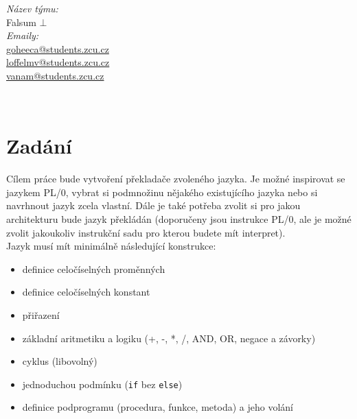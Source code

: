 \documentclass[12pt,a4paper]{article}
\begin{document}
\begin{titlepage}
\begin{minipage}{0.4\textwidth}
\begin{flushright}
\emph{Název týmu:} \\
Falsum $\bot$\\[0.2cm] %

\emph{Emaily:} \\
\href{mailto:goheeca@students.zcu.cz}{goheeca@students.zcu.cz}\\
\href{mailto:loffelmv@students.zcu.cz}{loffelmv@students.zcu.cz}\\
\href{mailto:vanam@students.zcu.cz}{vanam@students.zcu.cz}\\[0.2cm] %


\end{flushright}
\end{minipage}\\

\end{titlepage}


\thispagestyle{empty}

\tableofcontents


\newpage


\setcounter{page}{3}


\section{Zadání}

Cílem práce bude vytvoření překladače zvoleného jazyka. Je možné inspirovat se jazykem PL/0, vybrat si podmnožinu nějakého existujícího jazyka nebo si navrhnout jazyk zcela vlastní. Dále je také potřeba zvolit si pro jakou architekturu bude jazyk překládán (doporučeny jsou instrukce PL/0, ale je možné zvolit jakoukoliv instrukční sadu pro kterou budete mít interpret).\\

\noindent
Jazyk musí mít minimálně následující konstrukce:

\begin{itemize}
	\item definice celočíselných proměnných
    \item definice celočíselných konstant
    \item přiřazení
    \item základní aritmetiku a logiku (+, -, *, /, AND, OR, negace a závorky)
    \item cyklus (libovolný)
    \item jednoduchou podmínku (\texttt{if} bez \texttt{else})
    \item definice podprogramu (procedura, funkce, metoda) a jeho volání
\end{itemize}
\end{document}
